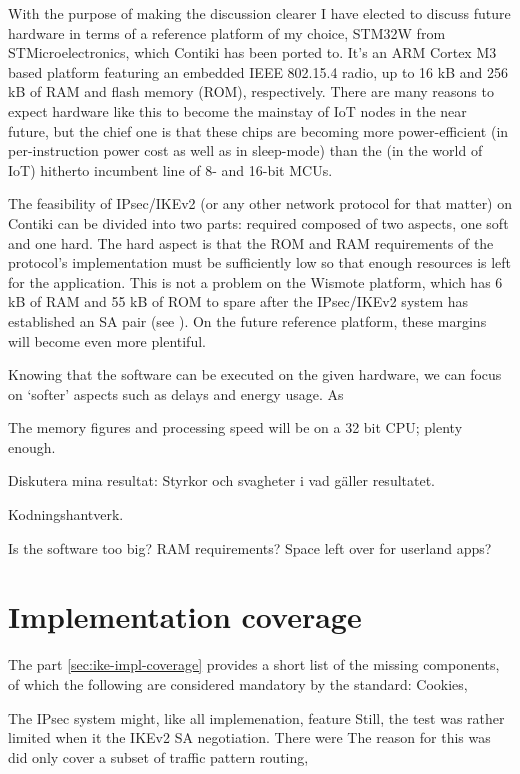 \documentclass[final,a4paper,twoside,11pt,onecolumn]{report}
\begin{document}
With the purpose of making the discussion clearer I have elected to discuss future hardware in terms of a reference platform of my choice, STM32W from STMicroelectronics, which Contiki has been ported to. It's an ARM Cortex M3 based platform featuring an embedded IEEE 802.15.4 radio, up to 16 kB and 256 kB of RAM and flash memory (ROM), respectively. There are many reasons to expect hardware like this to become the mainstay of IoT nodes in the near future, but the chief one is that these chips are becoming more power-efficient\cite{a-time-that-has-comeFIX} (in per-instruction power cost as well as in sleep-mode) than the (in the world of IoT) hitherto incumbent line of 8- and 16-bit MCUs.

The feasibility of IPsec/IKEv2 (or any other network protocol for that matter) on Contiki can be divided into two parts: required composed of two aspects, one soft and one hard. The hard aspect is that the ROM and RAM requirements of the protocol's implementation must be sufficiently low so that enough resources is left for the application. This is not a problem on the Wismote platform, which has  6 kB of RAM and 55 kB of ROM to spare after the IPsec/IKEv2 system has established an SA pair (see ). On the future reference platform, these margins will become even more plentiful.

Knowing that the software can be executed on the given hardware, we can focus on `softer' aspects such as delays and energy usage. As

The memory figures and processing speed will be on a 32 bit CPU; plenty enough.

Diskutera mina resultat: Styrkor och svagheter i vad gäller resultatet.

Kodningshantverk.

Is the software too big? RAM requirements? Space left over for userland apps?

\section{Implementation coverage}
   
 The part \ref{sec:ike-impl-coverage} provides a short list of the missing components, of which the following are considered mandatory by the standard: Cookies, 

The IPsec system might, like all implemenation, feature
Still, the test was rather limited when it  the IKEv2 SA negotiation. There were The reason for this was did only cover a subset of traffic pattern routing, 
\end{document}
